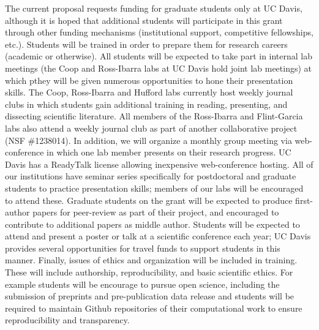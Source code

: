 The current proposal requests funding for graduate students only at UC Davis, although it is hoped that additional students will participate in this grant through other funding mechanisms (institutional support, competitive fellowships, etc.). Students will be trained in order to prepare them for research careers (academic or otherwise).  All students will be expected to take part in internal lab meetings (the Coop and Ross-Ibarra labs at UC Davis hold joint lab meetings) at which pthey will be given numerous opportunities to hone their presentation skills.  The Coop, Ross-Ibarra and Hufford labs currently host weekly journal clubs in which students gain additional training in reading, presenting, and dissecting scientific literature. All members of the Ross-Ibarra and Flint-Garcia labs also attend a weekly journal club as part of another collaborative project (NSF \#1238014). In addition, we will organize a monthly group meeting via web-conference in which one lab member presents on their research progress.  UC Davis has a ReadyTalk license allowing inexpensive web-conference hosting. All of our institutions have seminar series specifically for postdoctoral and graduate students to practice presentation skills; members of our labs will be encouraged to attend these.
Graduate students on the grant will be expected to produce first-author papers for peer-review as part of their project, and encouraged to contribute to additional papers as middle author.  Students will be expected to attend and present a poster or talk at a scientific conference each year; UC Davis provides several opportunities for travel funds to support students in this manner. Finally, issues of ethics and organization will be included in training.  These will include authorship, reproducibility, and basic scientific ethics. For example students will be encourage to pursue open science, including the submission of preprints and pre-publication data release and students will be required to maintain Github repositories of their computational work to ensure reproducibility and transparency.

 